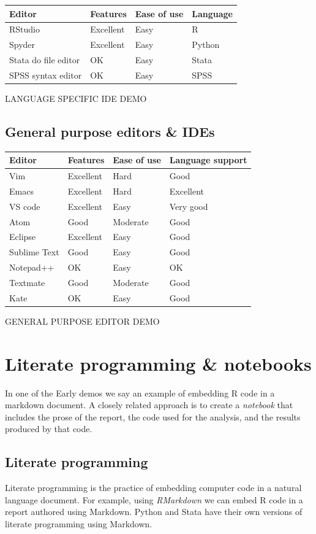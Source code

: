 \documentclass[]{book}
\begin{document}
\begin{longtable}[]{@{}llll@{}}
\toprule
Editor & Features & Ease of use & Language\tabularnewline
\midrule
\endhead
RStudio & Excellent & Easy & R\tabularnewline
Spyder & Excellent & Easy & Python\tabularnewline
Stata do file editor & OK & Easy & Stata\tabularnewline
SPSS syntax editor & OK & Easy & SPSS\tabularnewline
\bottomrule
\end{longtable}

LANGUAGE SPECIFIC IDE DEMO

\hypertarget{general-purpose-editors-ides}{%
\subsection{General purpose editors \& IDEs}\label{general-purpose-editors-ides}}

\begin{longtable}[]{@{}llll@{}}
\toprule
Editor & Features & Ease of use & Language support\tabularnewline
\midrule
\endhead
Vim & Excellent & Hard & Good\tabularnewline
Emacs & Excellent & Hard & Excellent\tabularnewline
VS code & Excellent & Easy & Very good\tabularnewline
Atom & Good & Moderate & Good\tabularnewline
Eclipse & Excellent & Easy & Good\tabularnewline
Sublime Text & Good & Easy & Good\tabularnewline
Notepad++ & OK & Easy & OK\tabularnewline
Textmate & Good & Moderate & Good\tabularnewline
Kate & OK & Easy & Good\tabularnewline
\bottomrule
\end{longtable}

GENERAL PURPOSE EDITOR DEMO

\hypertarget{literate-programming-notebooks}{%
\section{Literate programming \& notebooks}\label{literate-programming-notebooks}}

In one of the Early demos we say an example of embedding R code in a markdown document. A closely related approach is to create a \emph{notebook} that includes the prose of the report, the code used for the analysis, and the results produced by that code.

\hypertarget{literate-programming}{%
\subsection{Literate programming}\label{literate-programming}}

Literate programming is the practice of embedding computer code in a natural language document. For example, using \emph{RMarkdown} we can embed R code in a report authored using Markdown. Python and Stata have their own versions of literate programming using Markdown.
\end{document}
